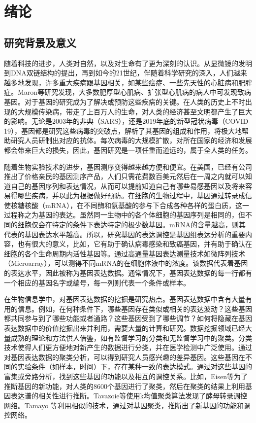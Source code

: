 \chapter{绪论}

\section{研究背景及意义}
    随着科技的进步，人类对自然，以及对生命有了更为深刻的认识。从显微镜的发明到DNA双链结构的提出，再到如今的21世纪，伴随着科学研究的深入，人们越来越多地发现，许多重大疾病跟基因相关，如某些癌症、一些先天性的心脏病和肥胖症。Maron\cite{maron2014hypertrophic}等研究发现，大多数肥厚型心肌病、扩张型心肌病的病人中可发现致病基因。对于基因的研究成为了解决或预防这些疾病的关键。在人类的历史上不时出现的大规模传染病，带走了上百万人的生命，对人类的经济甚至文明都产生了巨大的影响。无论是2003年的非典\cite{sars}（SARS），还是2019年底的新型冠状病毒\cite{covid-19}（COVID-19），基因都是研究这些病毒的突破点，解析了其基因的组成和作用，将极大地帮助研究人员研制出对应的抗体。每次病毒的大规模扩散，对所在国家的经济和发展都会带来巨大的损失，因此，基因研究是一项任重而道远的，属于全人类的任务。

    随着生物实验技术的进步，基因测序变得越来越方便和便宜。在美国，已经有公司推出了价格亲民的基因测序产品，人们只需花费数百美元然后在一周之内就可以知道自己的基因序列和表达情况，从而可以提前知道自己有哪些易感基因以及将来容易得哪些疾病，并以此为根据做好预防。在细胞的生物过程中，基因通过转录成信使核糖核酸（mRNA），在不同酶和氨基酸的参与下合成各种各样的蛋白质，这一过程称之为基因的表达。虽然同一生物中的各个体细胞的基因序列是相同的，但不同的细胞仅会在特定的条件下表达特定的极少数基因。mRNA的含量越高，则其代表的基因表达水平越高。所以，研究基因的表达调控是基因组表达分析的重要内容，也有很大的意义，比如，它有助于确认病毒感染和致癌基因，并有助于确认在细胞的各个生命周期内活性基因等。通过高通量基因表达测量技术如微阵列技术（Microarray），可以测得不同mRNA的在细胞体液中的浓度。该数据代表着基因的表达水平，因此被称为基因表达数据。通常情况下，基因表达数据的每一行都有一个相应的基因名字或编号，每一列则代表一个条件或样本。

    在生物信息学中，对基因表达数据的挖掘是研究热点。基因表达数据中含有大量有用的信息。例如，在何种条件下，哪些基因存在类似或相关的表达波动？这些基因都共同参与到了哪些功能或者通路？这些基因受到了哪些调节？如何将隐藏在基因表达数据中的价值挖掘出来并利用，需要大量的计算和研究。数据挖掘领域已经大量成熟的理论和方法供人借鉴，如有监督学习的分类和无监督学习中的聚类。分类技术使得人们更方便地对新产生的数据进行分类，并在医学检测中广泛使用。通过对基因表达数据的聚类分析，可以得到研究人员感兴趣的差异基因。这些基因在不同的实验条件（如样本，时间）下，存在某种一致的表达模式。通过对这些基因的富集或旁路分析，找到这些基因的功能以及相互的调控关系。比如，Eisen\cite{eisen1998cluster}等为了推断基因的新功能，对人类的8600个基因进行了聚类，然后在聚类的结果上利用基因表达谱的相关性进行推断。Tavazoie\cite{tavazoie1999systematic}等使用k均值聚类算法发现了酵母转录调控网络。Tamayo\cite{tamayo1999interpreting} 等利用相似的技术，通过对基因聚类，推断出了新基因的功能和调控网络。 

